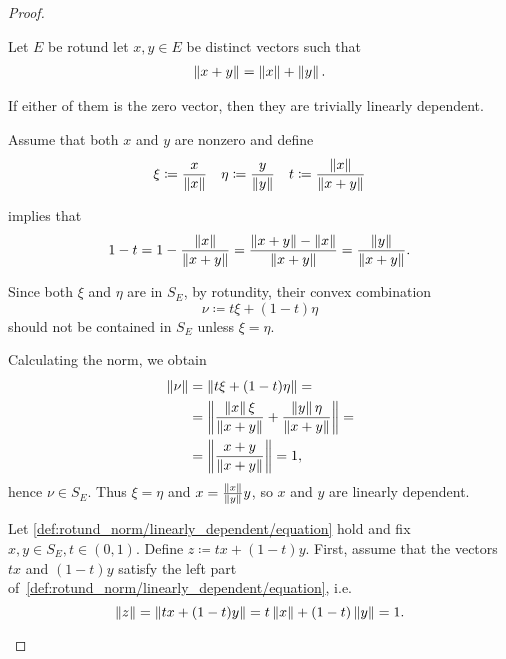 \begin{proof}
\begin{description}
     Let \( E \) be rotund let \( x, y \in E \) be distinct vectors such that
    \begin{align}\label{def:rotund_norm/linearly_dependent/assumption}
      \left\Vert x + y \right\Vert = \left\Vert x \right\Vert + \left\Vert y \right\Vert.
    \end{align}

    If either of them is the zero vector, then they are trivially linearly dependent.

    Assume that both \( x \) and \( y \) are nonzero and define
    \begin{align*}
      \xi \coloneqq \frac x {\left\Vert x \right\Vert}
      &&
      \eta \coloneqq \frac y {\left\Vert y \right\Vert}
      &&
      t \coloneqq \frac {\left\Vert x \right\Vert} {\left\Vert x + y \right\Vert}
    \end{align*}

     implies that
    \begin{equation*}
      1 - t = 1 - \frac {\left\Vert x \right\Vert} {\left\Vert x + y \right\Vert} = \frac {\left\Vert x + y \right\Vert - \left\Vert x \right\Vert} {\left\Vert x + y \right\Vert} = \frac {\left\Vert y \right\Vert} {\left\Vert x+y \right\Vert}.
    \end{equation*}

    Since both \( \xi \) and \( \eta \) are in \( S_E \), by rotundity, their convex combination
    \begin{equation*}
      \nu \coloneqq t \xi + (1-t)\eta
    \end{equation*}
    should not be contained in \( S_E \) unless \( \xi = \eta \).

    Calculating the norm, we obtain
    \begin{align*}
      \left\Vert \nu \right\Vert
      &=
      \left\Vert t \xi + (1-t)\eta \right\Vert
      = \\ &=
      \left\Vert \frac {\left\Vert x \right\Vert \xi} {\left\Vert x + y \right\Vert} + \frac {\left\Vert y \right\Vert \eta} {\left\Vert x + y \right\Vert} \right\Vert
      = \\ &=
      \left\Vert \frac {x + y} {\left\Vert x + y \right\Vert} \right\Vert
      = 1,
    \end{align*}
    hence \( \nu \in S_E \). Thus \( \xi = \eta \) and \( x = \frac {\left\Vert x \right\Vert} {\left\Vert y \right\Vert} y \), so \( x \) and \( y \) are linearly dependent.

     Let \cref{def:rotund_norm/linearly_dependent/equation} hold and fix \( x, y \in S_E, t \in (0, 1) \). Define \( z \coloneqq tx + (1-t)y \).
    First, assume that the vectors \( tx \) and \( (1-t)y \) satisfy the left part of~\cref{def:rotund_norm/linearly_dependent/equation}, i.e.
    \begin{equation*}
       \left\Vert z \right\Vert = \left\Vert tx + (1-t)y \right\Vert = t \left\Vert x \right\Vert + (1-t) \left\Vert y \right\Vert = 1.
    \end{equation*}


\end{description}
\end{proof}
